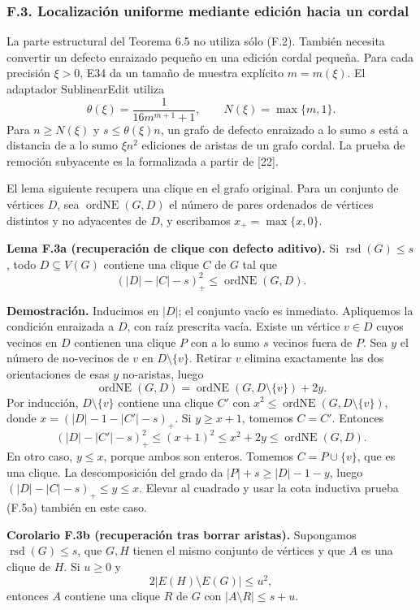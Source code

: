 \documentclass[spanish,11pt,a4paper]{article}
\begin{document}
\subsubsection{F.3. Localización uniforme mediante edición hacia un cordal}\label{f.3.-localizacion-uniforme-mediante-edicion-hacia-un-cordal}

La parte estructural del Teorema 6.5 no utiliza sólo (F.2). También necesita convertir un defecto enraizado pequeño en una edición cordal pequeña. Para cada precisión \(\xi>0\), E34 da un tamaño de muestra explícito \(m=m(\xi)\). El adaptador SublinearEdit utiliza \[
\theta(\xi)=\frac1{16m^{m+1}+1},\qquad N(\xi)=\max\{m,1\}.
\tag{F.5}
\] Para \(n\ge N(\xi)\) y \(s\le\theta(\xi)n\), un grafo de defecto enraizado a lo sumo \(s\) está a distancia de a lo sumo \(\xi n^2\) ediciones de aristas de un grafo cordal. La prueba de remoción subyacente es la formalizada a partir de {[}22{]}.

El lema siguiente recupera una clique en el grafo original. Para un conjunto de vértices \(D\), sea \(\operatorname{ordNE}(G,D)\) el número de pares ordenados de vértices distintos y no adyacentes de \(D\), y escribamos \(x_+=\max\{x,0\}\).

\textbf{Lema F.3a (recuperación de clique con defecto aditivo).} Si \(\operatorname{rsd}(G)\le s\), todo \(D\subseteq V(G)\) contiene una clique \(C\) de \(G\) tal que \[
(|D|-|C|-s)_+^2\le\operatorname{ordNE}(G,D).
\tag{F.5a}
\]

\textbf{Demostración.} Inducimos en \(|D|\); el conjunto vacío es inmediato. Apliquemos la condición enraizada a \(D\), con raíz prescrita vacía. Existe un vértice \(v\in D\) cuyos vecinos en \(D\) contienen una clique \(P\) con a lo sumo \(s\) vecinos fuera de \(P\). Sea \(y\) el número de no-vecinos de \(v\) en \(D\setminus\{v\}\). Retirar \(v\) elimina exactamente las dos orientaciones de esas \(y\) no-aristas, luego \[
\operatorname{ordNE}(G,D)
=\operatorname{ordNE}(G,D\setminus\{v\})+2y.
\] Por inducción, \(D\setminus\{v\}\) contiene una clique \(C'\) con \(x^2\le\operatorname{ordNE}(G,D\setminus\{v\})\), donde \(x=(|D|-1-|C'|-s)_+\). Si \(y\ge x+1\), tomemos \(C=C'\). Entonces \[
(|D|-|C'|-s)_+^2\le(x+1)^2
\le x^2+2y\le\operatorname{ordNE}(G,D).
\] En otro caso, \(y\le x\), porque ambos son enteros. Tomemos \(C=P\cup\{v\}\), que es una clique. La descomposición del grado da \(|P|+s\ge |D|-1-y\), luego \((|D|-|C|-s)_+\le y\le x\). Elevar al cuadrado y usar la cota inductiva prueba (F.5a) también en este caso.

\textbf{Corolario F.3b (recuperación tras borrar aristas).} Supongamos \(\operatorname{rsd}(G)\le s\), que \(G,H\) tienen el mismo conjunto de vértices y que \(A\) es una clique de \(H\). Si \(u\ge0\) y \[
2|E(H)\setminus E(G)|\le u^2,
\] entonces \(A\) contiene una clique \(R\) de \(G\) con \(|A\setminus R|\le s+u\).
\end{document}
